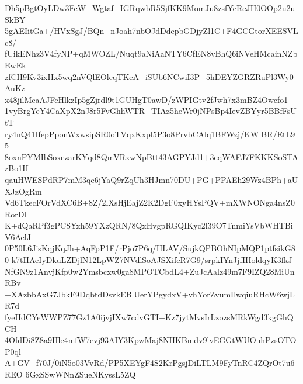 Dh5pBgtOyLDw3FcW+Wgtaf+IGRqwbR5SjfKK9MomJu8zsfYeReJH0OOp2u2uSkBY
5gAEIitGa+/HVxSgJ/BQn+nJoah7nbOJdDdepbGDjyZl1C+F4GCGtorXEESVLc8/
fUikENhz3V4fyNP+qMWOZL/Nuqt9aNiAaNTY6CfEN8vBhQ6iNVeHMcainNZbEwEk
zfCH9Kv3ixHx5wq2nVQlEOleqTKeA+iSUb6NCwiI3P+5hDEYZGRZRuPl3Wy0AuKz
x48jilMcaAJFcHlkzIp5gZjrdl9t1GUHgT0awD/zWPIGtv2fJwh7x3mBZ4Owcfo1
1vyBrgYeY4CaXpX2nJ8r5FvGhhWTR+TIAz5heWr0jNPsBp4IevZBYyr5BBfFsUtT
ry4nQ41IfepPponWxwsipSR0oTVqxKxpl5P3o8PrvbCAlq1BFWzj/KWlBR/EtL95
8oxnPYMIbSoxezarKYqd8QmVRxwNpBtt43AGPYJd1+3eqWAFJ7FKKKSoSTAzBo1H
qauHWESPdRP7mM3qe6jYaQ9rZqUh3HJmn70DU+PG+PPAEh29Wz4BPh+aUXJzOgRm
Vd6TkecFOrVdXC6B+8Z/2lXsHjEajZ2K2DgF0xyHYsPQV+mXWNONga4nsZ0RorDI
K+dQaRPf3gPCSYxh59YXzQRN/8QxHvgpRGQIKyc2l39O7TnmiYsVbWHTBiV6AelJ
0P50L6JisKqjKqJh+AqFpP1F/rPjo7P6q/HLAV/SujkQPBOhNIpMQP1ptfsikG80
k7tHAeIyDkuLZDjlN12LpWZ7NVdlSoAJSXifcR7G9/srpkIYnJjfIHoldqyK3fkJ
NfGN9z1AnvjKfp0w2Ymsbcxw0ga8MPOTCbdL4+ZuJcAalz49m7F9IZQ28MiUnRBv
+XAzbbAxG7JbkF9DqbtdDsvkEBlUerYPgydxV+vhYorZvumIlwqiuRHcW6wjLR7d
fyeHdCYeWWPZ77Gz1A0ijvjIXw7cdvGTI+Kz7jytMvsIrLzozsMRkWgd3kgGhQCH
4OfdDi8Z8a9Hle4mfW7evj93AIY3KpwMaj8NHKBmdv9lvEGGtWUOuhPzsOTOP0ql
A+GV+f70J/0iN5o03VvRd/PP5XEYgF4S2KrPgsjDiLTLM9FyTnRC4ZQrOt7u6REO
6GxSSwWNnZSueNKyssL5ZQ==
